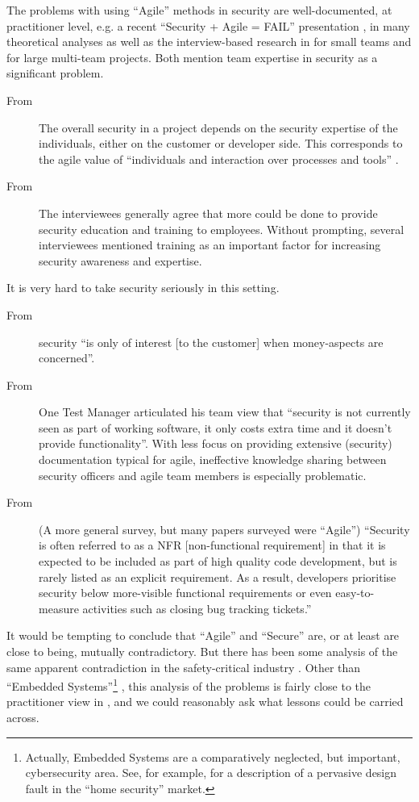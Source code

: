 \documentclass{llncs}
\begin{document}
The problems with using ``Agile'' methods in security are well-documented, at practitioner level, e.g. a recent ``Security + Agile = FAIL'' presentation \cite{Lane2018a}, in many theoretical analyses as well as the interview-based research in \cite{Bartsch2011a} for small teams and  \cite{vanderHeijdenetal2018a} for large multi-team projects. Both mention team expertise in security as a significant problem.
\begin{description}
\item[From \cite{Bartsch2011a}]The
overall security in a project depends on the security expertise
of the individuals, either on the customer or developer side.
This corresponds to the agile value of ``individuals and
interaction over processes and tools'' \cite[Value 1]{Becketal2001}.
\item[From \cite{vanderHeijdenetal2018a}]The interviewees
generally agree that more could be done to provide security education
and training to employees. Without prompting, several
interviewees mentioned training as an important factor for increasing
security awareness and expertise. 
\end{description}
It is very hard to take security seriously in this setting.
\begin{description}
\item[From \cite{Bartsch2011a}]security ``is only of interest [to the customer] when money-aspects are
concerned''.
\item[From \cite{vanderHeijdenetal2018a}]One Test Manager articulated his team view
that ``security is not currently seen as part of working software,
it only costs extra time and it doesn't provide functionality''.  With less focus on
providing extensive (security) documentation typical for agile, ineffective
knowledge sharing between security officers and agile team
members is especially problematic.
\item[From \cite{TahaeiVaniea2019a}](A more general survey, but many papers surveyed were ``Agile'') ``Security is often referred to as a NFR [non-functional requirement] in that it
is expected to be included as part of high quality code development,
but is rarely listed as an explicit requirement.
As a result, developers prioritise security below more-visible
functional requirements or even easy-to-measure activities
such as closing bug tracking tickets.''
\end{description}
\par\noindent
It would be tempting to conclude that ``Agile'' and ``Secure'' are, or at least are close to being, mutually contradictory. But there has been some analysis of the same apparent contradiction in the safety-critical industry \cite{Chapman2016a}.  Other than ``Embedded Systems''\footnote{Actually, Embedded Systems are a comparatively neglected, but important, cybersecurity area. See, for example, \cite{OConnoretal2019a} for a description of a pervasive design fault in the ``home security'' market.} \cite[\S 3.6]{Chapman2016a}, this analysis of the problems is fairly close to the practitioner view in \cite{Lane2018a}, and we could reasonably ask what lessons could be carried across. 
\end{document}
